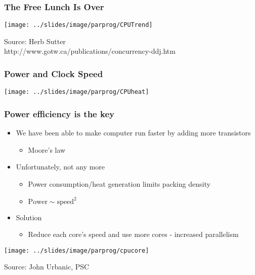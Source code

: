 \documentclass[10pt,t]{beamer}
\begin{document}
\begin{frame}
  \frametitle{The Free Lunch Is Over}
  \begin{center}
    \texttt{[image: ../slides/image/parprog/CPUTrend]}
    
    
    \tiny{Source: Herb Sutter\\
      http://www.gotw.ca/publications/concurrency-ddj.htm}
  \end{center}
\end{frame}

\begin{frame}
  \frametitle{Power and Clock Speed}
  \texttt{[image: ../slides/image/parprog/CPUheat]}
\end{frame}

\begin{frame}
  \frametitle{Power efficiency is the key}
  \begin{itemize}
  \item We have been able to make computer run faster by adding more transistors
    \begin{itemize}
    \item Moore's law
    \end{itemize}
  \item Unfortunately, not any more
    \begin{itemize}
    \item Power consumption/heat generation limits packing density
    \item $\mathrm{Power} \sim \mathrm{speed}^2$
    \end{itemize}
  \item Solution
    \begin{itemize}
    \item Reduce each core's speed and use more cores - increased
      parallelism
    \end{itemize}
  \end{itemize}
  \begin{center}
    \texttt{[image: ../slides/image/parprog/cpucore]}
    
    \tiny{Source: John Urbanic, PSC}
  \end{center}
\end{frame}
\end{document}
